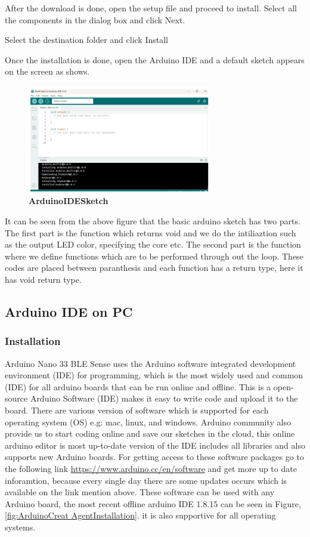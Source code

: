 After the download is done, open the setup file and proceed to install.
Select all the components in the dialog box and click Next.

Select the destination folder and click Install





Once the installation is done, open the Arduino IDE and a default sketch appears on the screen as shows.

\begin{figure}[H]\centering
	\includegraphics[width=8cm]{Images/software/ArduinoIDESketch}
	\caption{\textbf{ArduinoIDESketch}}
\label{fig:ArduinoIDESketch}		
\end{figure}


It can be seen from the above figure that the basic arduino sketch has two parts. The first part is the function  which returns void and we do the intiliaztion such as the output LED color, specifying the core etc. The second part is the function  where we define functions which are to be performed through out the loop. These codes are placed between paranthesis \PYTHON{$\{ \}$} and each function has a return type, here it has void return type.

\subsection{Arduino IDE on PC}
\subsubsection{Installation}
Arduino Nano 33 BLE Sense uses the Arduino software integrated development environment (IDE) for programming, which is the most widely used and common (IDE) for all arduino boards that can be run online and offline. This is a open-source Arduino Software (IDE) makes it easy to write code and upload it to the board. There are various version of software which is supported for each operating system (OS) e.g: mac, linux, and windows. Arduino community also provide us to start coding online and save our sketches in the cloud, this online arduino editor is most up-to-date version of the IDE includes all libraries and also supports new Arduino boards. For getting access to these software packages go to the following link \url{https://www.arduino.cc/en/software}  and get more up to date inforamtion, because every single day there are some updates occurs which is available on the link mention above. These software can be used with any Arduino board, the most recent offline arduino IDE 1.8.15 can be seen in Figure,\ref{fig:ArduinoCreat AgentInstallation}. it is also supportive for all operating systems.


